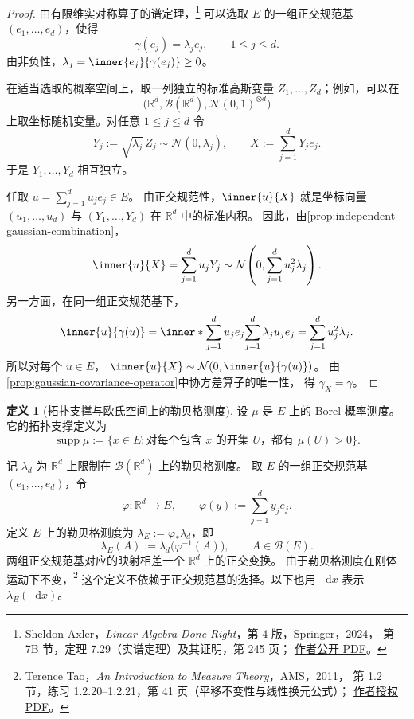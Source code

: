 \documentclass[UTF8,11pt,a4paper,oneside,fontset=fandol]{ctexrep}
\numberwithin{equation}{section}
\theoremstyle{plain}
\theoremstyle{definition}
\newtheorem{definition}[theorem]{定义}
\theoremstyle{remark}
\newcommand{\R}{\mathbb{R}}
\newcommand{\B}{\mathcal{B}}
\newcommand{\dd}{\mathop{}\!\mathrm{d}}
\begin{document}
\begin{proof}
由有限维实对称算子的谱定理，\footnote{%
\label{fn:real-spectral-theorem}%
Sheldon Axler，\emph{Linear Algebra Done Right}，第 4 版，Springer，2024，
第 7B 节，定理 7.29（实谱定理）及其证明，第 245 页；
\href{https://linear.axler.net/LADR4e.pdf}{作者公开 PDF}。}
可以选取 $E$ 的一组正交规范基
$(e_1,\ldots,e_d)$，使得
\[
  \gamma(e_j)=\lambda_j e_j,\qquad 1\le j\le d.
\]
由非负性，$\lambda_j=\inner{e_j}{\gamma(e_j)}\ge0$。

\begin{samepage}
在适当选取的概率空间上，取一列独立的标准高斯变量
$Z_1,\ldots,Z_d$；例如，可以在
\[
  \bigl(\R^d,\B(\R^d),\mathcal{N}(0,1)^{\otimes d}\bigr)
\]
上取坐标随机变量。对任意 $1\le j\le d$ 令
\[
  Y_j:=\sqrt{\lambda_j}\,Z_j\sim\mathcal{N}(0,\lambda_j),
  \qquad X:=\sum_{j=1}^{d}Y_j e_j.
\]
于是 $Y_1,\ldots,Y_d$ 相互独立。
\end{samepage}

任取 $u=\sum_{j=1}^{d}u_j e_j\in E$。
由正交规范性，$\inner{u}{X}$ 就是坐标向量
$(u_1,\ldots,u_d)$ 与 $(Y_1,\ldots,Y_d)$ 在 $\R^d$ 中的标准内积。
因此，由\cref{prop:independent-gaussian-combination}，
\[
  \inner{u}{X}
  =\sum_{j=1}^{d}u_jY_j
  \sim\mathcal{N}\!\left(0,\sum_{j=1}^{d}u_j^2\lambda_j\right).
\]
另一方面，在同一组正交规范基下，
\[
  \inner{u}{\gamma(u)}
  =\inner*{\sum_{j=1}^{d}u_j e_j}
          {\sum_{j=1}^{d}\lambda_j u_j e_j}
  =\sum_{j=1}^{d}u_j^2\lambda_j.
\]
所以对每个 $u\in E$，
$\inner{u}{X}\sim\mathcal{N}(0,\inner{u}{\gamma(u)})$。
由\cref{prop:gaussian-covariance-operator}中协方差算子的唯一性，
得 $\gamma_X=\gamma$。
\end{proof}

\begin{definition}[拓扑支撑与欧氏空间上的勒贝格测度]
\label{def:support-euclidean-lebesgue}
设 $\mu$ 是 $E$ 上的 Borel 概率测度。它的拓扑支撑定义为
\[
  \operatorname{supp}\mu
  :=\bigl\{x\in E:\text{对每个包含 $x$ 的开集 $U$，都有 $\mu(U)>0$}\bigr\}.
\]

记 $\lambda_d$ 为 $\R^d$ 上限制在 $\B(\R^d)$ 上的勒贝格测度。
取 $E$ 的一组正交规范基 $(e_1,\ldots,e_d)$，令
\[
  \varphi:\R^d\longrightarrow E,\qquad
  \varphi(y):=\sum_{j=1}^{d}y_je_j.
\]
定义 $E$ 上的勒贝格测度为 $\lambda_E:=\varphi_*\lambda_d$，即
\[
  \lambda_E(A):=\lambda_d\bigl(\varphi^{-1}(A)\bigr),
  \qquad A\in\B(E).
\]
两组正交规范基对应的映射相差一个 $\R^d$ 上的正交变换。
由于勒贝格测度在刚体运动下不变，\footnote{%
Terence Tao，\emph{An Introduction to Measure Theory}，AMS，2011，
第 1.2 节，练习 1.2.20--1.2.21，第 41 页（平移不变性与线性换元公式）；
\href{https://terrytao.wordpress.com/wp-content/uploads/2012/12/gsm-126-tao5-measure-book.pdf}{作者授权 PDF}。}
这个定义不依赖于正交规范基的选择。以下也用 $\dd x$ 表示 $\lambda_E(\dd x)$。
\end{definition}
\end{document}
